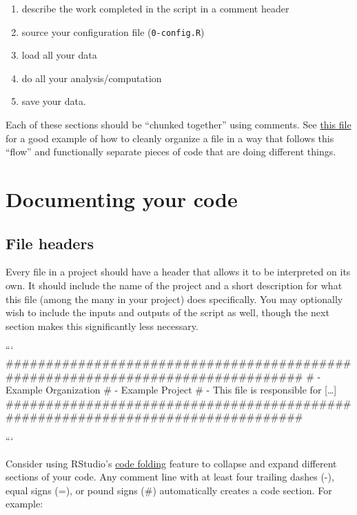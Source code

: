 \documentclass[]{book}
\providecommand{\tightlist}{%
  \setlength{\itemsep}{0pt}\setlength{\parskip}{0pt}}
\begin{document}
\begin{enumerate}
\def\labelenumi{\arabic{enumi}.}
\tightlist
\item
  describe the work completed in the script in a comment header
\item
  source your configuration file (\texttt{0-config.R})
\item
  load all your data
\item
  do all your analysis/computation
\item
  save your data.
\end{enumerate}

Each of these sections should be ``chunked together'' using comments.
See
\href{https://github.com/kmishra9/Flu-Absenteeism/blob/master/Master's\%20Thesis\%20-\%20Spatial\%20Epidemiology\%20of\%20Influenza/2a\%20-\%20Statistical-Inputs.R}{this
file} for a good example of how to cleanly organize a file in a way that
follows this ``flow'' and functionally separate pieces of code that are
doing different things.

\section{Documenting your code}\label{documenting-your-code}

\subsection{File headers}\label{file-headers}

Every file in a project should have a header that allows it to be
interpreted on its own. It should include the name of the project and a
short description for what this file (among the many in your project)
does specifically. You may optionally wish to include the inputs and
outputs of the script as well, though the next section makes this
significantly less necessary.

```
\#\#\#\#\#\#\#\#\#\#\#\#\#\#\#\#\#\#\#\#\#\#\#\#\#\#\#\#\#\#\#\#\#\#\#\#\#\#\#\#\#\#\#\#\#\#\#\#\#\#\#\#\#\#\#\#\#\#\#\#\#\#\#\#\#\#\#\#\#\#\#\#\#\#\#\#\#\#\#\#
\# \citet{Organization} - Example Organization \# \citet{Project} -
Example Project \# \citet{Description} - This file is responsible for
{[}\ldots{}{]}
\#\#\#\#\#\#\#\#\#\#\#\#\#\#\#\#\#\#\#\#\#\#\#\#\#\#\#\#\#\#\#\#\#\#\#\#\#\#\#\#\#\#\#\#\#\#\#\#\#\#\#\#\#\#\#\#\#\#\#\#\#\#\#\#\#\#\#\#\#\#\#\#\#\#\#\#\#\#\#\#

```

Consider using RStudio's
\href{https://support.rstudio.com/hc/en-us/articles/200484568-Code-Folding-and-Sections}{code
folding} feature to collapse and expand different sections of your code.
Any comment line with at least four trailing dashes (-), equal signs
(=), or pound signs (\#) automatically creates a code section. For
example:
\end{document}
